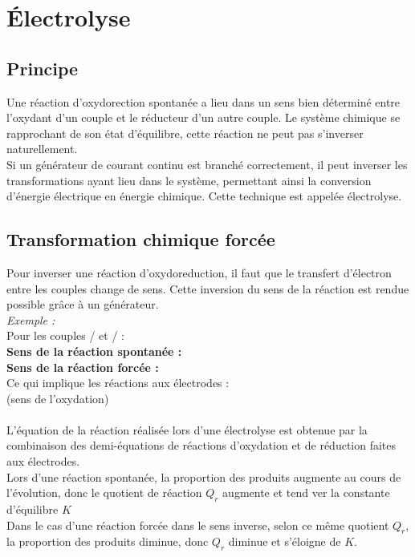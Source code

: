 \documentclass[a4paper,12pt,fleqn]{scrartcl}%
\begin{document}
	\maketitle
\section{Électrolyse}
\subsection{Principe}
Une réaction d'oxydorection spontanée a lieu dans un sens bien déterminé entre l'oxydant d'un couple et le réducteur d'un autre couple. Le système chimique se rapprochant de son état d'équilibre, cette réaction ne peut pas s'inverser naturellement.\\
Si un générateur de courant continu est branché correctement, il peut inverser les transformations ayant lieu dans le système, permettant ainsi la conversion d'énergie électrique en énergie chimique. Cette technique est appelée électrolyse.

\subsection{Transformation chimique forcée}
Pour inverser une réaction d'oxydoreduction, il faut que le transfert d'électron entre les couples change de sens. Cette inversion du sens de la réaction est rendue possible grâce à un générateur.\\

\emph{Exemple :}\\
Pour les couples / et / :\\
\textbf{Sens de la réaction spontanée :} \\
\textbf{Sens de la réaction forcée :} \\
Ce qui implique les réactions aux électrodes :\\
 (sens de l'oxydation)\\
\\

\vspace{1em}
L'équation de la réaction réalisée lors d'une électrolyse est obtenue par la combinaison des demi-équations de réactions d'oxydation et de réduction faites aux électrodes.\\
Lors d'une réaction spontanée, la proportion des produits augmente au cours de l'évolution, donc le quotient de réaction $Q_r$ augmente et tend ver la constante d'équilibre $K$\\
Dans le cas d'une réaction forcée dans le sens inverse, selon ce même quotient $Q_r$, la proportion des produits diminue, donc $Q_r$ diminue et s'éloigne de $K$.
\end{document}
